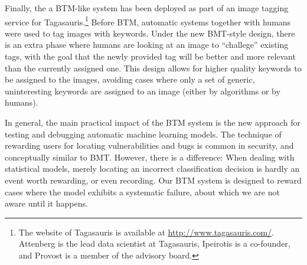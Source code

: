 Finally, the a BTM-like system has been deployed as part of an image tagging service for Tagasauris.\footnote{The website of Tagasauris is available at \url{http://www.tagasauris.com/}. Attenberg is the lead data scientist at Tagasauris, Ipeirotis is a co-founder, and Provost is a member of the advisory board.} Before BTM, automatic systems together with humans were used to tag images with keywords. Under the new BMT-style design, there is an extra phase where humans are looking at an image to ``challege'' existing tags, with the goal that the newly provided tag will be better and more relevant than the currently assigned one.  This design allows for higher quality keywords to be assigned to the images, avoiding cases where only a set of generic, uninteresting keywords are assigned to an image (either by algorithms or by humans).

In general, the main practical impact of the BTM system is the new approach for testing and debugging automatic machine learning models. The technique of rewarding users for locating vulnerabilities and bugs is common in security, and conceptually similar to BMT. However, there is a difference: When dealing with statistical models, merely locating an incorrect classification decision is hardly an event worth rewarding, or even recording. Our BTM system is designed to reward cases where the model exhibits a systematic failure, about which we are not aware until it happens.
